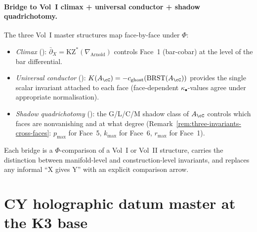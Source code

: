 \paragraph{Bridge to Vol~I climax + universal conductor + shadow quadrichotomy.}
The three Vol~I master structures map face-by-face under $\Phi$:
\begin{itemize}
\item \emph{Climax} (\cite{VolI}): $\bar\partial_X = \mathrm{KZ}^*(\nabla_{\mathrm{Arnold}})$
controls Face~1 (bar-cobar) at the level of the bar differential.
\item \emph{Universal conductor} (\cite{VolI}):
$K(A_\cC) = -c_{\mathrm{ghost}}(\mathrm{BRST}(A_\cC))$ provides the
single scalar invariant attached to each face (face-dependent
$\kappa_\bullet$-values agree under appropriate normalisation).
\item \emph{Shadow quadrichotomy} (\cite{VolI}):
the G/L/C/M shadow class of $A_\cC$ controls which faces are nonvanishing
and at what degree (Remark~\ref{rem:three-invariants-cross-faces}: $p_{\max}$
for Face~5, $k_{\max}$ for Face~6, $r_{\max}$ for Face~1).
\end{itemize}

\noindent Each bridge is a \(\Phi\)-comparison of a Vol~I or Vol~II
structure, carries the distinction between manifold-level and
construction-level invariants, and replaces any informal ``X gives Y''
with an explicit comparison arrow.

\section{CY holographic datum master at the K3 base}
\label{sec:cyhdm-cross-volume}

